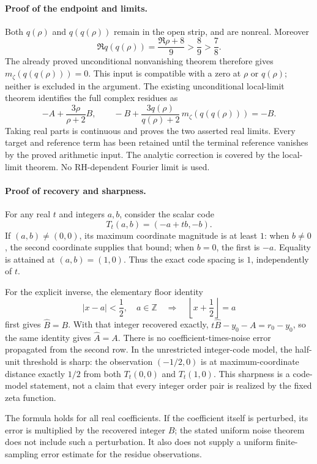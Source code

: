 \paragraph{Proof of the endpoint and limits.}
Both \(q(\rho)\) and \(q(q(\rho))\) remain in the open strip, and are nonreal.
Moreover
\[
 \Re q(q(\rho))=\frac{\Re\rho+8}{9}>\frac89>\frac78.
\]
The already proved unconditional nonvanishing theorem therefore gives
\(m_\zeta(q(q(\rho)))=0\). This input is compatible with a zero at
\(\rho\) or \(q(\rho)\); neither is excluded in the argument.
The existing unconditional local-limit theorem identifies the full complex
residues as
\[
 -A+\frac{3\rho}{\rho+2}B,
 \qquad
 -B+\frac{3q(\rho)}{q(\rho)+2}\,m_\zeta(q(q(\rho)))=-B.
\]
Taking real parts is continuous and proves the two asserted real limits.
Every target and reference term has been retained until the terminal
reference vanishes by the proved arithmetic input. The analytic correction
is covered by the local-limit theorem. No RH-dependent Fourier limit is used.

\paragraph{Proof of recovery and sharpness.}
For any real \(t\) and integers \(a,b\), consider the scalar code
\[
 T_t(a,b)=(-a+tb,-b).
\]
If \((a,b)\ne(0,0)\), its maximum coordinate magnitude is at least \(1\):
when \(b\ne0\), the second coordinate supplies that bound; when \(b=0\),
the first is \(-a\). Equality is attained at \((a,b)=(1,0)\).
Thus the exact code spacing is \(1\), independently of \(t\).

For the explicit inverse, the elementary floor identity
\[
 |x-a|<\frac12,\quad a\in\mathbb Z
 \quad\Longrightarrow\quad \left\lfloor x+\frac12\right\rfloor=a
\]
first gives \(\widehat B=B\). With that integer recovered exactly,
\(t\widehat B-y_0-A=r_0-y_0\), so the same identity gives \(\widehat A=A\).
There is no coefficient-times-noise error propagated from the second row.
In the unrestricted integer-code model, the half-unit threshold is sharp:
the observation \((-1/2,0)\) is at maximum-coordinate distance exactly
\(1/2\) from both \(T_t(0,0)\) and \(T_t(1,0)\).
This sharpness is a code-model statement, not a claim that every integer
order pair is realized by the fixed zeta function.

The formula holds for all real coefficients. If the coefficient itself is
perturbed, its error is multiplied by the recovered integer \(B\); the stated
uniform noise theorem does not include such a perturbation. It also does not
supply a uniform finite-sampling error estimate for the residue observations.

